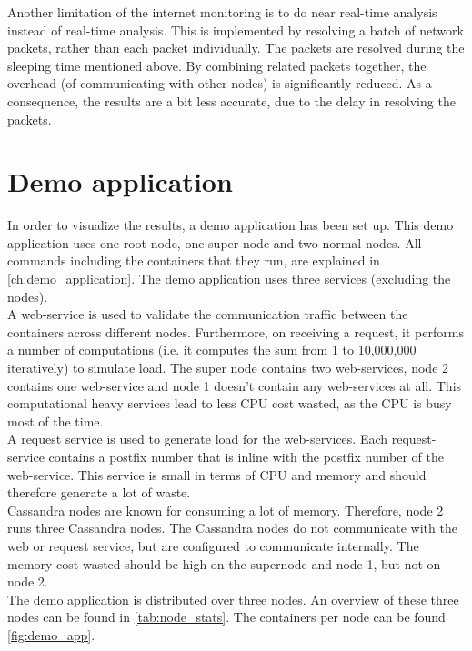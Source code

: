 \noindent
Another limitation of the internet monitoring is to do near real-time analysis instead of real-time analysis. This is implemented by resolving a batch of network packets, rather than each packet individually. The packets are resolved during the sleeping time mentioned above. By combining related packets together, the overhead (of communicating with other nodes) is significantly reduced. As a consequence, the results are a bit less accurate, due to the delay in resolving the packets.


\section{Demo application} \label{sec:demo_app}
In order to visualize the results, a demo application has been set up. This demo application uses one root node, one super node and two normal nodes. All commands including the containers that they run, are explained in \autoref{ch:demo_application}. The demo application uses three services (excluding the nodes).\\

\noindent
A web-service is used to validate the communication traffic between the containers across different nodes. Furthermore, on receiving a request, it performs a number of computations (i.e. it computes the sum from 1 to 10,000,000 iteratively) to simulate load. The super node contains two web-services, node 2 contains one web-service and node 1 doesn't contain any web-services at all. This computational heavy services lead to less CPU cost wasted, as the CPU is busy most of the time.\\

\noindent
A request service is used to generate load for the web-services. Each request-service contains a postfix number that is inline with the postfix number of the web-service. This service is small in terms of CPU and memory and should therefore generate a lot of waste.\\

\noindent
Cassandra nodes are known for consuming a lot of memory. Therefore, node 2 runs three Cassandra nodes. The Cassandra nodes do not communicate with the web or request service, but are configured to communicate internally. The memory cost wasted should be high on the supernode and node 1, but not on node 2.\\

\noindent
The demo application is distributed over three nodes. An overview of these three nodes can be found in \autoref{tab:node_stats}. The containers per node can be found \autoref{fig:demo_app}.\\

